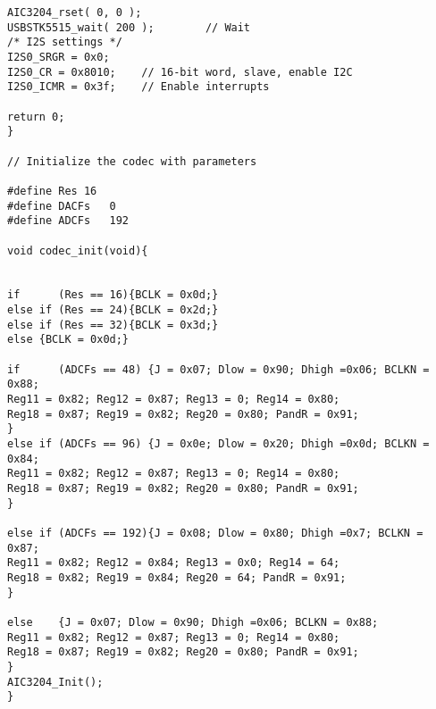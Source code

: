 \begin{lstlisting}[caption=DSP code.]
AIC3204_rset( 0, 0 );    
USBSTK5515_wait( 200 );        // Wait
/* I2S settings */
I2S0_SRGR = 0x0;
I2S0_CR = 0x8010;    // 16-bit word, slave, enable I2C
I2S0_ICMR = 0x3f;    // Enable interrupts

return 0;
}

// Initialize the codec with parameters

#define Res	16
#define DACFs	0
#define ADCFs	192

void codec_init(void){


if 		(Res == 16){BCLK = 0x0d;}
else if (Res == 24){BCLK = 0x2d;}
else if (Res == 32){BCLK = 0x3d;}
else {BCLK = 0x0d;}

if 		(ADCFs == 48) {J = 0x07; Dlow = 0x90; Dhigh =0x06; BCLKN = 0x88;
Reg11 = 0x82; Reg12 = 0x87; Reg13 = 0; Reg14 = 0x80; 	
Reg18 = 0x87; Reg19 = 0x82; Reg20 = 0x80; PandR = 0x91;
}
else if	(ADCFs == 96) {J = 0x0e; Dlow = 0x20; Dhigh =0x0d; BCLKN = 0x84;
Reg11 = 0x82; Reg12 = 0x87; Reg13 = 0; Reg14 = 0x80;
Reg18 = 0x87; Reg19 = 0x82; Reg20 = 0x80; PandR = 0x91;
}

else if (ADCFs == 192){J = 0x08; Dlow = 0x80; Dhigh =0x7; BCLKN = 0x87; 
Reg11 = 0x82; Reg12 = 0x84; Reg13 = 0x0; Reg14 = 64; 	
Reg18 = 0x82; Reg19 = 0x84; Reg20 = 64; PandR = 0x91;
}	

else 	{J = 0x07; Dlow = 0x90; Dhigh =0x06; BCLKN = 0x88;
Reg11 = 0x82; Reg12 = 0x87; Reg13 = 0; Reg14 = 0x80; 	
Reg18 = 0x87; Reg19 = 0x82; Reg20 = 0x80; PandR = 0x91;
}
AIC3204_Init();
}
\end{lstlisting}